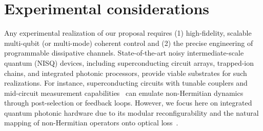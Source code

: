 \documentclass[longbibliography, aps, prx, amsmath, amssymb, amsfonts, twocolumn,superscriptaddress, footinbib]{revtex4-1}
\begin{document}
	\section{Experimental considerations}
	{
	Any experimental realization of our proposal requires (1) high-fidelity, scalable multi-qubit (or multi-mode) coherent control and (2) the precise engineering of programmable dissipative channels. State-of-the-art noisy intermediate-scale quantum (NISQ) devices, including superconducting circuit arrays, trapped-ion chains, and integrated photonic processors, provide viable substrates for such realizations. For instance, superconducting circuits with tunable couplers and mid-circuit measurement capabilities~\cite{guo2021observation, preskill2018quantum, wu2021strong} can emulate non-Hermitian dynamics through post-selection or feedback loops. However, we focus here on integrated quantum photonic hardware due to its modular reconfigurability and the natural mapping of non-Hermitian operators onto optical loss~\cite{zhong2020quantum, madsen2022quantum, zhu2024dynamically, zhu2024large}. 
	}
\end{document}
